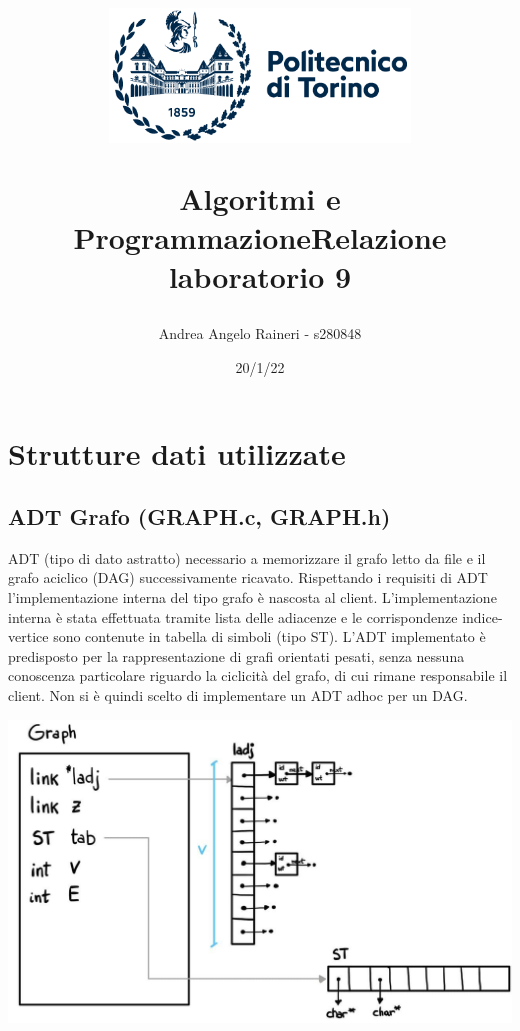 \documentclass[11pt, a4paper, titlepage]{article}
\begin{document}
    \title{
        \begin{figure}[t]
            \includegraphics[width=8cm]{logo.png}
            \centering
        \end{figure}
            \textbf{Algoritmi e Programmazione\break Relazione laboratorio 9}
        }
    \author{Andrea Angelo Raineri - s280848}
    \date{20/1/22}
    \maketitle

    \section{Strutture dati utilizzate}

        \subsection{ADT Grafo (GRAPH.c, GRAPH.h)}
            ADT (tipo di dato astratto) necessario a memorizzare il grafo letto da file e il grafo aciclico (DAG) successivamente ricavato.
            Rispettando i requisiti di ADT l'implementazione interna del tipo grafo è nascosta al client.
            L'implementazione interna è stata effettuata tramite lista delle adiacenze e le corrispondenze indice-vertice sono contenute in tabella di simboli (tipo ST).
            L'ADT implementato è predisposto per la rappresentazione di grafi orientati pesati, senza nessuna conoscenza particolare riguardo la ciclicità del grafo, di cui rimane responsabile il client. Non
            si è quindi scelto di implementare un ADT adhoc per un DAG.

            \includegraphics[width=15cm]{graph.jpg}
            
\end{document}
